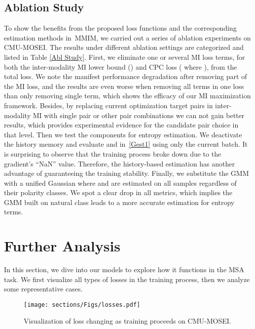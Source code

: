\documentclass[11pt]{article}
\newcommand{\modelname}{MMIM}
\begin{document}
 \subsection{Ablation Study} \label{ABLS}
To show the benefits from the proposed loss functions and the corresponding estimation methods in~\modelname, we carried out a series of ablation experiments on CMU-MOSEI. 
The results under different ablation settings are categorized and listed in Table \ref{Abl Study}.
First, we eliminate one or several MI loss terms, for both the inter-modality MI lower bound () and 
CPC loss ( where ), from the total loss. 
We note the manifest performance degradation after removing part of the MI loss, and the results are even worse when removing all terms in one loss than only removing single term, which shows the efficacy of our MI maximization framework.
Besides, by replacing current optimization target pairs in inter-modality MI with single pair or other pair combinations we can not gain better results, which provides experimental evidence for the candidate pair choice in that level. 
Then we test the components for entropy estimation. 
We deactivate the history memory and evaluate  and  in~\eqref{Gest1} using only the current batch. It is surprising to observe that the training process broke down due to the gradient's ``NaN'' value.
Therefore, the history-based estimation has another advantage of guaranteeing the training stability.
Finally, we substitute the GMM with a unified Gaussian where  and  are estimated on all samples regardless of their polarity classes.
We spot a clear drop in all metrics, which implies the GMM built on natural class leads to a more accurate estimation for entropy terms.


 \section{Further Analysis}
In this section, we dive into our models to explore how it functions in the MSA task. We first visualize all types of losses in the training process, then we analyze some representative cases.

\begin{figure}
    \centering
\texttt{[image: sections/Figs/losses.pdf]}
\caption{Visualization of loss changing as training proceeds on CMU-MOSEI.}
    \label{Loss vis}
\end{figure}
\end{document}
